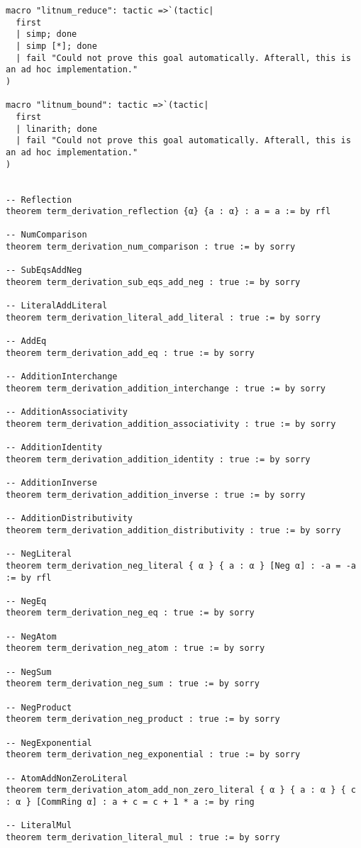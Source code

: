 \documentclass{article}
\begin{document}
\begin{tcolorbox}[colback=white!10, width=\linewidth]
\begin{lstlisting}[language=Lean4]
macro "litnum_reduce": tactic =>`(tactic|
  first
  | simp; done
  | simp [*]; done
  | fail "Could not prove this goal automatically. Afterall, this is an ad hoc implementation."
)

macro "litnum_bound": tactic =>`(tactic|
  first
  | linarith; done
  | fail "Could not prove this goal automatically. Afterall, this is an ad hoc implementation."
)


-- Reflection
theorem term_derivation_reflection {α} {a : α} : a = a := by rfl

-- NumComparison
theorem term_derivation_num_comparison : true := by sorry

-- SubEqsAddNeg
theorem term_derivation_sub_eqs_add_neg : true := by sorry

-- LiteralAddLiteral
theorem term_derivation_literal_add_literal : true := by sorry

-- AddEq
theorem term_derivation_add_eq : true := by sorry

-- AdditionInterchange
theorem term_derivation_addition_interchange : true := by sorry

-- AdditionAssociativity
theorem term_derivation_addition_associativity : true := by sorry

-- AdditionIdentity
theorem term_derivation_addition_identity : true := by sorry

-- AdditionInverse
theorem term_derivation_addition_inverse : true := by sorry

-- AdditionDistributivity
theorem term_derivation_addition_distributivity : true := by sorry

-- NegLiteral
theorem term_derivation_neg_literal { α } { a : α } [Neg α] : -a = -a := by rfl

-- NegEq
theorem term_derivation_neg_eq : true := by sorry

-- NegAtom
theorem term_derivation_neg_atom : true := by sorry

-- NegSum
theorem term_derivation_neg_sum : true := by sorry

-- NegProduct
theorem term_derivation_neg_product : true := by sorry

-- NegExponential
theorem term_derivation_neg_exponential : true := by sorry

-- AtomAddNonZeroLiteral
theorem term_derivation_atom_add_non_zero_literal { α } { a : α } { c : α } [CommRing α] : a + c = c + 1 * a := by ring

-- LiteralMul
theorem term_derivation_literal_mul : true := by sorry


\end{lstlisting}
\end{tcolorbox}
\end{document}
